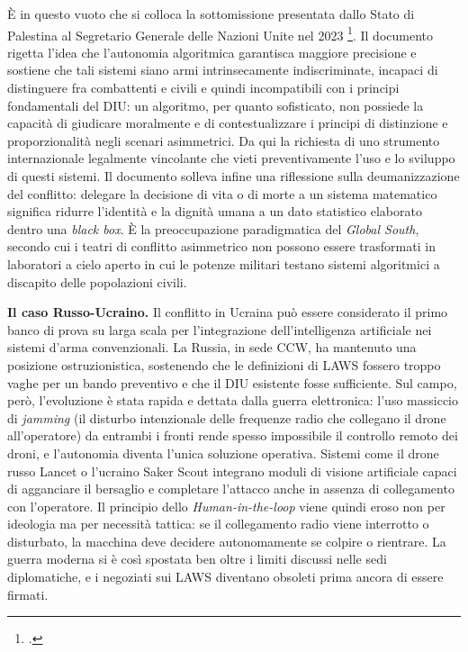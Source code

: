 \ifstampa\documentclass[a4paper,12pt,twoside,openright]{report}\else\documentclass[a4paper,12pt]{report}\fi
\newif\ifrevisione \revisionefalse
\DeclareRobustCommand{\rev}[1]{\ifrevisione{\color{blue!65!black}#1}\else#1\fi}
\begin{document}
È in questo vuoto che si colloca la sottomissione presentata dallo Stato di
Palestina al Segretario Generale delle Nazioni Unite nel 2023
\footcite{palestine_2023}. Il documento rigetta l'idea che l'autonomia
algoritmica garantisca maggiore precisione e sostiene che tali sistemi siano
armi intrinsecamente indiscriminate, incapaci di distinguere fra combattenti e
civili e quindi incompatibili con i principi fondamentali del DIU: un algoritmo,
per quanto sofisticato, non possiede la capacità di giudicare moralmente e di
contestualizzare i principi di distinzione e proporzionalità negli scenari
asimmetrici. Da qui la richiesta di uno strumento internazionale legalmente
vincolante che vieti preventivamente l'uso e lo sviluppo di questi sistemi. Il
documento solleva infine una riflessione sulla deumanizzazione del conflitto:
delegare la decisione di vita o di morte a un sistema matematico significa
ridurre l'identità e la dignità umana a un dato statistico elaborato dentro una
\textit{black box}. È la preoccupazione paradigmatica del \textit{Global South},
secondo cui i teatri di conflitto asimmetrico non possono essere trasformati in
laboratori a cielo aperto in cui le potenze militari testano sistemi algoritmici
a discapito delle popolazioni civili.
 
\textbf{Il caso Russo-Ucraino.}
Il conflitto in Ucraina può essere considerato il primo banco di prova su larga scala per
l'integrazione dell'intelligenza artificiale nei sistemi d'arma convenzionali.
La Russia, in sede CCW, ha mantenuto una posizione ostruzionistica, sostenendo
che le definizioni di LAWS fossero troppo vaghe per un bando preventivo e che il
\rev{DIU} esistente fosse sufficiente. Sul campo, però,
l'evoluzione è stata rapida e dettata dalla guerra elettronica: l'uso massiccio
di \textit{jamming} \rev{(il disturbo intenzionale delle frequenze radio che
collegano il drone all'operatore)} da entrambi i fronti rende spesso impossibile il controllo
remoto dei droni, e l'autonomia diventa l'unica soluzione operativa. Sistemi
come il drone russo Lancet o l'ucraino Saker Scout integrano moduli di visione
artificiale capaci di agganciare il bersaglio e completare l'attacco anche in
assenza di collegamento con l'operatore. Il principio dello
\textit{Human-in-the-loop} viene quindi eroso non per ideologia ma per necessità
tattica: se il collegamento radio viene interrotto o disturbato, la macchina deve decidere autonomamente se colpire o
rientrare.
La guerra moderna si è così spostata ben oltre i limiti discussi nelle sedi
diplomatiche, e i negoziati sui LAWS diventano obsoleti prima ancora di essere firmati.
 
\end{document}
